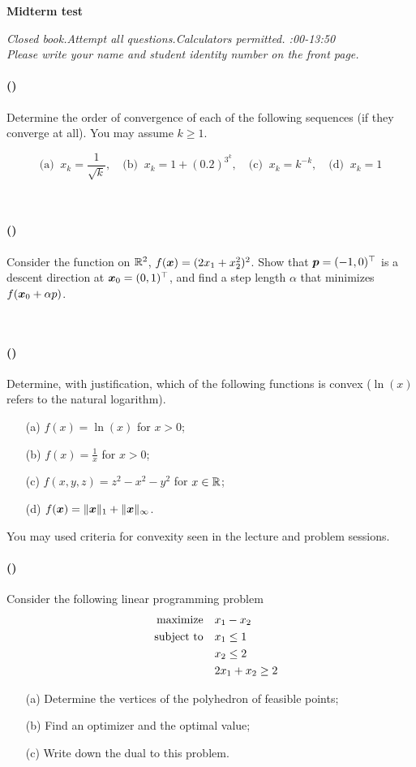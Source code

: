 \documentclass{article}
\newcounter{problems}
\renewcommand{\problem}[1]{\paragraph{(\theproblems)}\addtocounter{problems}{1}\label{#1}}
\newcommand{\marks}[2][0mm]{\hspace{30mm}\mbox{}\vskip #1\hspace{-30mm}\hfill{\sf [#2 marks]}\\[-\baselineskip]}
\renewcommand{\marks}[2][0mm]{\hspace{30mm}\mbox{}\vskip #1\hspace{-30mm}\hfill{\sf [#2 marks]}\\[-\baselineskip]}
\begin{document}
 
\begin{center}
{\Large {\bf Midterm test}}
\end{center}

\begin{center} 
\emph{Closed book.\quad Attempt all questions.\quad Calculators permitted. :00-13:50}\\
{\em Please write your name and student identity number on the front page.}
\end{center}

\problem{p0} Determine the order of convergence of each of the following sequences (if they converge at all). You may assume $k\geq 1$.

\begin{equation*}
 \text{(a) } \ x_k = \frac{1}{\sqrt{k}}, \quad \text{(b) } \ x_k = 1+(0.2)^{3^k}, \quad \text{(c) } \ x_k=k^{-k}, \quad \text{(d) } \ x_k = 1
\end{equation*}

\marks[-6mm]{4}


\problem{p1} Consider the function on $\mathbb{R}^2$, $f(\bm{x}) = (2x_1+x_2^2)^2$. Show that $\bm{p}=(-1,0)^{\top}$ is a descent direction at $\bm{x}_0=(0,1)^{\top}$, and find a step length $\alpha$ that minimizes $f(\bm{x}_0+\alpha p)$. 

\marks[-4mm]{4}


\problem{p2} Determine, with justification, which of the following functions is convex ($\ln(x)$ refers to the natural logarithm).
\begin{itemize}
 \item[(a)] $\displaystyle f(x)=\ln(x)$ for $x>0$;
 \item[(b)] $\displaystyle f(x)=\frac{1}{x}$ for $x>0$;
 \item[(c)] $\displaystyle f(x,y,z) = z^2-x^2-y^2$ for $x\in \mathbb{R}$;
 \item[(d)] $\displaystyle f(\bm{x}) = \Vert {\bm{x}}\Vert_1+\Vert {\bm{x}}\Vert_\infty$.
 \end{itemize}
You may used criteria for convexity seen in the lecture and problem sessions.
\marks[-6mm]{4} 

\problem{p3} Consider the following linear programming problem
\begin{align*}
 \text{maximize}\quad & x_1-x_2 \\
 \quad\text{subject to}\quad & x_1\leq 1\\
	 & x_2\leq 2\\
         & 2x_1+x_2\geq 2
\end{align*}
\begin{itemize}
 \item[(a)] Determine the vertices of the polyhedron of feasible points;
 \item[(b)] Find an optimizer and the optimal value;
 \item[(c)] Write down the dual to this problem.
\end{itemize}
\end{document}
